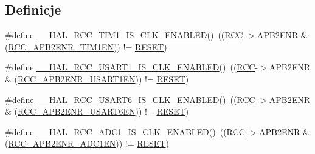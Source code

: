 \subsection*{Definicje}
\begin{DoxyCompactItemize}
\item 
\#define \hyperlink{group___r_c_c___a_p_b2___peripheral___clock___enable___disable___status_gad2b7c3a381d791c4ee728e303935832a}{\+\_\+\+\_\+\+H\+A\+L\+\_\+\+R\+C\+C\+\_\+\+T\+I\+M1\+\_\+\+I\+S\+\_\+\+C\+L\+K\+\_\+\+E\+N\+A\+B\+L\+ED}()~((\hyperlink{group___peripheral__declaration_ga74944438a086975793d26ae48d5882d4}{R\+CC}-\/$>$A\+P\+B2\+E\+NR \& (\hyperlink{group___peripheral___registers___bits___definition_ga25852ad4ebc09edc724814de967816bc}{R\+C\+C\+\_\+\+A\+P\+B2\+E\+N\+R\+\_\+\+T\+I\+M1\+EN})) != \hyperlink{group___exported__types_gga89136caac2e14c55151f527ac02daaffa589b7d94a3d91d145720e2fed0eb3a05}{R\+E\+S\+ET})
\item 
\#define \hyperlink{group___r_c_c___a_p_b2___peripheral___clock___enable___disable___status_ga59bd3cd20df76f885695fcdad1edce27}{\+\_\+\+\_\+\+H\+A\+L\+\_\+\+R\+C\+C\+\_\+\+U\+S\+A\+R\+T1\+\_\+\+I\+S\+\_\+\+C\+L\+K\+\_\+\+E\+N\+A\+B\+L\+ED}()~((\hyperlink{group___peripheral__declaration_ga74944438a086975793d26ae48d5882d4}{R\+CC}-\/$>$A\+P\+B2\+E\+NR \& (\hyperlink{group___peripheral___registers___bits___definition_ga4666bb90842e8134b32e6a34a0f165f3}{R\+C\+C\+\_\+\+A\+P\+B2\+E\+N\+R\+\_\+\+U\+S\+A\+R\+T1\+EN})) != \hyperlink{group___exported__types_gga89136caac2e14c55151f527ac02daaffa589b7d94a3d91d145720e2fed0eb3a05}{R\+E\+S\+ET})
\item 
\#define \hyperlink{group___r_c_c___a_p_b2___peripheral___clock___enable___disable___status_ga639ccb1e63662b309fc875bc608aa7e6}{\+\_\+\+\_\+\+H\+A\+L\+\_\+\+R\+C\+C\+\_\+\+U\+S\+A\+R\+T6\+\_\+\+I\+S\+\_\+\+C\+L\+K\+\_\+\+E\+N\+A\+B\+L\+ED}()~((\hyperlink{group___peripheral__declaration_ga74944438a086975793d26ae48d5882d4}{R\+CC}-\/$>$A\+P\+B2\+E\+NR \& (\hyperlink{group___peripheral___registers___bits___definition_ga0569d91f3b18ae130b7a09e0100c4459}{R\+C\+C\+\_\+\+A\+P\+B2\+E\+N\+R\+\_\+\+U\+S\+A\+R\+T6\+EN})) != \hyperlink{group___exported__types_gga89136caac2e14c55151f527ac02daaffa589b7d94a3d91d145720e2fed0eb3a05}{R\+E\+S\+ET})
\item 
\#define \hyperlink{group___r_c_c___a_p_b2___peripheral___clock___enable___disable___status_ga66eb89f7d856d9107e814efc751e8996}{\+\_\+\+\_\+\+H\+A\+L\+\_\+\+R\+C\+C\+\_\+\+A\+D\+C1\+\_\+\+I\+S\+\_\+\+C\+L\+K\+\_\+\+E\+N\+A\+B\+L\+ED}()~((\hyperlink{group___peripheral__declaration_ga74944438a086975793d26ae48d5882d4}{R\+CC}-\/$>$A\+P\+B2\+E\+NR \& (\hyperlink{group___peripheral___registers___bits___definition_ga57b9f50cb96a2e4ceba37728b4a32a42}{R\+C\+C\+\_\+\+A\+P\+B2\+E\+N\+R\+\_\+\+A\+D\+C1\+EN})) != \hyperlink{group___exported__types_gga89136caac2e14c55151f527ac02daaffa589b7d94a3d91d145720e2fed0eb3a05}{R\+E\+S\+ET})

\end{DoxyCompactItemize}
